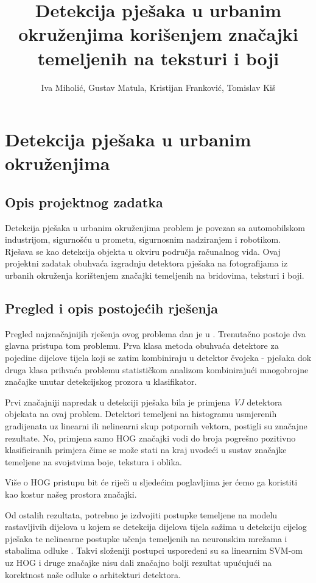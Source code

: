 \documentclass[seminar]{fer}
\title{Detekcija pješaka u urbanim okruženjima korišenjem značajki temeljenih na teksturi i boji}
\author{Iva Miholić, Gustav Matula, Kristijan Franković, Tomislav Kiš}
\begin{document}
\maketitle
\tableofcontents

\chapter{Detekcija pješaka u urbanim okruženjima}
\section{Opis projektnog zadatka}
Detekcija pješaka u urbanim okruženjima problem je povezan sa automobilskom industrijom, sigurnošću u prometu, sigurnosnim nadziranjem i robotikom. Rješava se kao detekcija objekta u okviru područja računalnog vida. Ovaj projektni zadatak obuhvaća izgradnju detektora pješaka na fotografijama iz urbanih okruženja korištenjem značajki temeljenih na bridovima,  teksturi i boji.

\section{Pregled i opis postojećih rješenja}

Pregled najznačajnijih rješenja ovog problema dan je u \cite{BenensonOHS14}. Trenutačno postoje dva glavna pristupa tom problemu. Prva klasa metoda obuhvaća detektore za pojedine dijelove tijela koji se zatim kombiniraju u detektor čvojeka - pješaka dok druga klasa prihvaća problemu statističkom analizom kombinirajući mnogobrojne značajke unutar detekcijskog prozora u klasifikator. 


Prvi značajniji napredak u detekciji pješaka bila je primjena \emph{VJ} detektora objekata \cite{VJ} na ovaj problem. Detektori temeljeni na histogramu usmjerenih gradijenata  \cite{HOG}  uz linearni ili nelinearni skup potpornih vektora, postigli su značajne rezultate. No, primjena samo HOG značajki vodi do broja pogrešno pozitivno klasificiranih primjera čime se može stati na kraj uvodeći u sustav značajke temeljene na svojstvima boje, tekstura i oblika. 

Više o HOG pristupu bit će riječi u sljedećim poglavljima jer ćemo ga koristiti kao kostur našeg prostora značajki.

Od ostalih rezultata, potrebno je izdvojiti postupke temeljene na modelu rastavljivih dijelova   u kojem se detekcija dijelova tijela sažima u detekciju cijelog pješaka te nelinearne postupke učenja temeljenih na neuronskim mrežama i stabalima odluke \cite{BenensonOHS14}. Takvi složeniji postupci uspoređeni su sa linearnim SVM-om uz HOG i druge značajke nisu dali značajno bolji rezultat upućujući na korektnost naše odluke o arhitekturi detektora.
\end{document}
